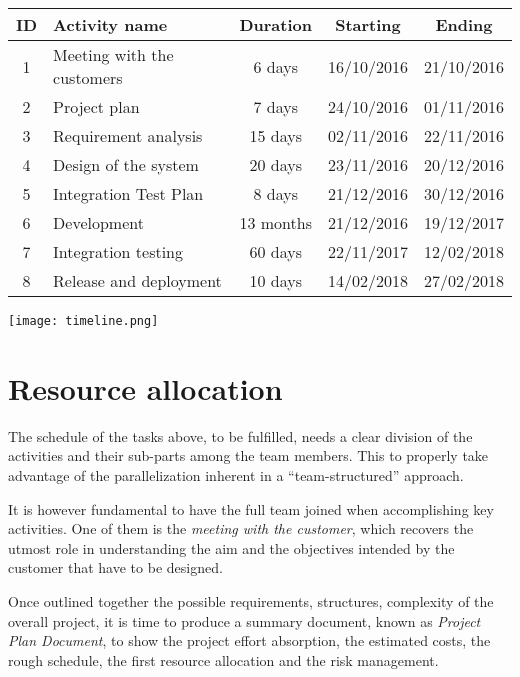 \documentclass{scrreprt}
\begin{document}
\begin{center}
    \begin{tabular}{clccc}
        \toprule
	   \textbf{ID}&\textbf{Activity name} & \textbf{Duration}& \textbf{Starting} &\textbf{Ending}\\
	   \midrule
        1&Meeting with the customers&6 days&16/10/2016&21/10/2016\\ 
        2&Project plan & 7 days&24/10/2016&01/11/2016\\
        3&Requirement analysis & 15 days & 02/11/2016 & 22/11/2016\\
        4&Design of the system &20 days&23/11/2016&20/12/2016\\   
        5&Integration Test Plan &8 days&21/12/2016&30/12/2016\\    
        6&Development &13 months&21/12/2016&19/12/2017\\   
        7&Integration testing&60 days&22/11/2017&12/02/2018\\   
        8&Release and deployment & 10 days & 14/02/2018 & 27/02/2018\\          
	\bottomrule
    \end{tabular}
\end{center}

\begin{center}
\texttt{[image: timeline.png]}
\end{center}

\chapter{Resource allocation}
The schedule of the tasks above, to be fulfilled, needs a clear division of the activities and their sub-parts among the team members. This to properly take advantage of the parallelization inherent in a ``team-structured'' approach.

It is however fundamental to have the full team joined when accomplishing key activities. One of them is the \emph{meeting with the customer}, which recovers the utmost role in understanding the aim and the objectives intended by the customer that have to be designed.

Once outlined together the possible requirements, structures, complexity of the overall project, it is time to produce a summary document, known as \emph{Project Plan Document}, to show the project effort absorption, the estimated costs, the rough schedule, the first resource allocation and the risk management.
\end{document}
